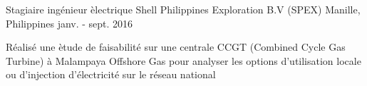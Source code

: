 \begin{cventries}
  \cventry
  {Stagiaire ing\'enieur \`electrique}
  {Shell Philippines Exploration B.V (SPEX)}
  {Manille, Philippines}
  {janv. - sept. 2016}
  {
    \begin{cvitems}
      \item{R\'ealis\'e une \`etude de faisabilit\'e sur une centrale CCGT (Combined Cycle Gas Turbine) \`a Malampaya Offshore Gas pour analyser les options d'utilisation locale ou d'injection d'\'electricit\'e sur le r\'eseau national}
    \end{cvitems}
    \vspace{1em}
  }
\end{cventries}

